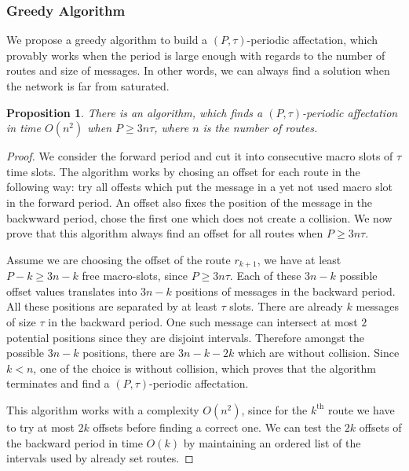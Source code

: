 \documentclass[a4paper,10pt]{article}
\newtheorem{proposition}{Proposition}
\begin{document}
    \subsubsection{Greedy Algorithm}
    
    We propose a greedy algorithm to build a $(P,\tau)$-periodic affectation, which provably works when
    the period is large enough with regards to the number of routes and size of messages. In other words, 
    we can always find a solution when the network is far from saturated. 
    
    \begin{proposition}
    There is an algorithm, which finds a $(P,\tau)$-periodic affectation in time $O(n^2)$ when $P \geq 3n\tau$,
    where $n$ is the number of routes.
    \end{proposition}
    \begin{proof}
     We consider the forward period and cut it into consecutive macro slots of $\tau$ time slots. The algorithm works by chosing an offset for each route in the following way: try all offests which put the message in a yet not used macro slot in the forward
     period. An offset also fixes the position of the message in the backwward period, chose the first one which does not create a collision. We now prove that this algorithm always find an offset for all routes when $P \geq 3n\tau$.
     
     Assume we are choosing the offset of the route $r_{k+1}$, we have  at least $P - k \geq 3n - k$ free macro-slots, since $P \geq 3n\tau$. Each of these $3n - k$ possible offset values translates into $3n - k$ positions of messages in the backward period. All these positions are separated by at least $\tau$ slots. There are already $k$ messages of size $\tau$ in the backward period. One such message can intersect at most $2$ potential positions since they are disjoint intervals. Therefore  amongst the possible $3n - k$ positions, there are  $3n - k -2k$ which are without collision. Since $k < n$, one of the choice is without collision, which proves that the algorithm terminates and find a  $(P,\tau)$-periodic affectation. 
     
     This algorithm works with a complexity $O(n^2)$, since for the $k^{\text{th}}$ route we have to try at most $2k$ offsets before finding a correct one. We can test the $2k$ offsets of the backward period in time $O(k)$ by maintaining an ordered list of the intervals used by already set routes.
     \end{proof}
     
\end{document}
